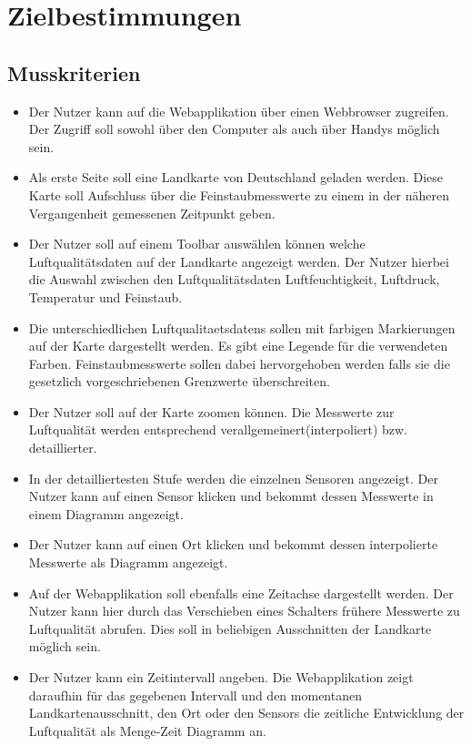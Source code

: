 \section{Zielbestimmungen}
\subsection{Musskriterien}
 \begin{itemize}
	\item Der Nutzer kann auf die Webapplikation über einen Webbrowser zugreifen. 
	Der Zugriff soll sowohl über den Computer als auch über Handys möglich sein.
	\item Als erste Seite soll eine Landkarte von Deutschland geladen werden.
	Diese Karte soll Aufschluss über die Feinstaubmesswerte zu einem in der näheren Vergangenheit gemessenen Zeitpunkt geben.
	\item Der Nutzer soll auf einem Toolbar auswählen können welche Luftqualitätsdaten auf der Landkarte angezeigt werden. 
	Der Nutzer hierbei die Auswahl zwischen den Luftqualitätsdaten Luftfeuchtigkeit, Luftdruck, Temperatur und Feinstaub.
	\item Die unterschiedlichen \glspl{Luftqualitaetsdaten} sollen mit farbigen Markierungen auf der Karte dargestellt werden. 
	Es gibt eine Legende für die verwendeten Farben.
	Feinstaubmesswerte sollen dabei hervorgehoben werden falls sie die gesetzlich vorgeschriebenen Grenzwerte überschreiten.
	\item Der Nutzer soll auf der Karte zoomen können. 
	Die Messwerte zur Luftqualität werden entsprechend verallgemeinert(interpoliert) bzw. detaillierter.
	\item In der detailliertesten Stufe werden die einzelnen Sensoren angezeigt. 
	Der Nutzer kann auf einen Sensor klicken und bekommt dessen Messwerte in einem Diagramm angezeigt.
	\item Der Nutzer kann auf einen Ort klicken und bekommt dessen interpolierte Messwerte als Diagramm angezeigt.
	\item Auf der Webapplikation soll ebenfalls eine Zeitachse dargestellt werden. 
	Der Nutzer kann hier durch das Verschieben eines Schalters frühere Messwerte zu Luftqualität abrufen. 
	Dies soll in beliebigen Ausschnitten der Landkarte möglich sein.
	\item Der Nutzer kann ein Zeitintervall angeben. Die Webapplikation zeigt daraufhin für das gegebenen Intervall 
	und den momentanen Landkartenausschnitt, den Ort oder den \glspl{Sensor} die zeitliche Entwicklung der Luftqualität als Menge-Zeit Diagramm an.

\end{itemize}
